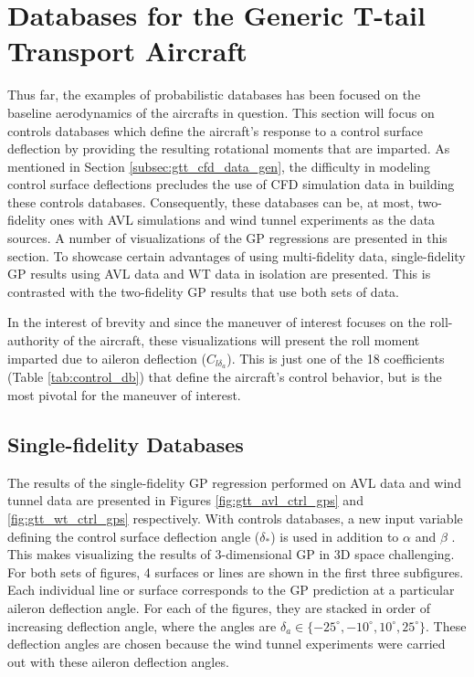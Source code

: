 \section{Databases for the Generic T-tail Transport Aircraft} \label{sec:gtt_dbs}

Thus far, the examples of probabilistic databases has been focused on the baseline aerodynamics of the aircrafts in question. 
This section will focus on controls databases which define the aircraft's response to a control surface deflection by providing the resulting rotational moments that are imparted. 
As mentioned in Section \ref{subsec:gtt_cfd_data_gen}, the difficulty in modeling control surface deflections precludes the use of CFD simulation data in building these controls databases. 
Consequently, these databases can be, at most, two-fidelity ones with AVL simulations and wind tunnel experiments as the data sources. 
A number of visualizations of the GP regressions are presented in this section.
To showcase certain advantages of using multi-fidelity data, single-fidelity GP results using AVL data and WT data in isolation are presented.
This is contrasted with the two-fidelity GP results that use both sets of data. 

In the interest of brevity and since the maneuver of interest focuses on the roll-authority of the aircraft, these visualizations will present the roll moment imparted due to aileron deflection ($C_{l{\delta_a}}$).
This is just one of the 18 coefficients (Table \ref{tab:control_db}) that define the aircraft's control behavior, but is the most pivotal for the maneuver of interest. 

\subsection{Single-fidelity Databases}
The results of the single-fidelity GP regression performed on AVL data and wind tunnel data are presented in Figures \ref{fig:gtt_avl_ctrl_gps} and \ref{fig:gtt_wt_ctrl_gps} respectively. 
With controls databases, a new input variable defining the control surface deflection angle ($\delta_*$) is used in addition to $\alpha$ and $\beta$ .
This makes visualizing the results of 3-dimensional GP in 3D space challenging. 
For both sets of figures, 4 surfaces or lines are shown in the first three subfigures. 
Each individual line or surface corresponds to the GP prediction at a particular aileron deflection angle.
For each of the figures, they are stacked in order of increasing deflection angle, where the angles are $\delta_a \in \{-25^\circ, -10^\circ, 10^\circ, 25^\circ\}$. 
These deflection angles are chosen because the wind tunnel experiments were carried out with these aileron deflection angles. 

